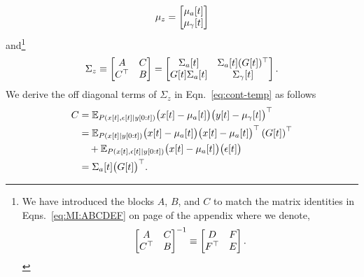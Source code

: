 \begin{enumerate}
  \begin{equation*}
    \mu_z =
    \begin{bmatrix}
      {\mu_a}{[t]}\\
      {\mu_\gamma}{[t]}      
    \end{bmatrix}
  \end{equation*}
  and\footnote{We have introduced the blocks $A$, $B$, and $C$ to
    match the matrix identities in Eqns.~\eqref{eq:MI:ABCDEF} on page
    \pageref{eq:MI:ABCDEF} of the appendix where we
    denote,
    \begin{equation*}
      \begin{bmatrix} A & C \\ C^\top & B \end{bmatrix}^{-1} \equiv
      \begin{bmatrix} D & F \\ F^\top & E \end{bmatrix}.
    \end{equation*}}
  \begin{equation}
    \label{eq:cont-temp}
    \Sigma_z \equiv
    \begin{bmatrix} A & C \\ C^\top & B \end{bmatrix} =
    \begin{bmatrix}
      {\Sigma_a}{[t]} & {\Sigma_a}{[t]} ({G}{[t]})^\top
      \\ {G}{[t]} {\Sigma_a}{[t]}&{\Sigma_\gamma}{[t]} 
    \end{bmatrix}.
  \end{equation}
  We derive the off diagonal terms of $\Sigma_z$ in
  Eqn.~\eqref{eq:cont-temp} as follows
  \begin{align}
    C &= \mathbb{E}_{P\left({x}{[t]},{\epsilon}{[t]}\mid y[0:t] \right)}
    \big( {x}{[t]} - {\mu_a}{[t]} \big) \big( {y}{[t]}
      - {\mu_\gamma}{[t]} \big)^\top \nonumber \\
    &=  \mathbb{E}_{P\left({x}{[t]}\mid y[0:t] \right)}
    \big( {x}{[t]} - {\mu_a}{[t]} \big)
    \big( {x}{[t]} - {\mu_a}{[t]} \big)^\top
    \left({G}{[t]} \right)^\top \nonumber \\
    & \quad +
    \mathbb{E}_{P\left({x}{[t]},{\epsilon}{[t]}\mid y[0:t] \right)}
    \big( {x}{[t]} - {\mu_a}{[t]} \big) \big( {\epsilon}{[t]}
    \big) \nonumber \\
    \label{eq:cont:C}
    &= {\Sigma_{a}}{[t]} \big({G}{[t]} \big)^\top .
  \end{align}

\end{enumerate}

